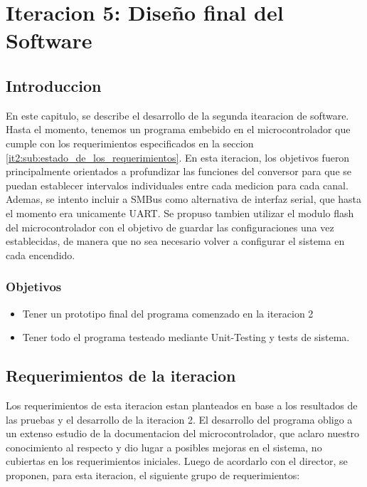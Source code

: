 \chapter{Iteracion 5: Diseño final del Software} %
\label{cha:iteracion_5}

\section{Introduccion} %
\label{it5:sec:introduccion}

En este capitulo, se describe el desarrollo de la segunda itearacion de software. Hasta el momento, tenemos un programa embebido en el microcontrolador que cumple con los requerimientos especificados en la seccion \ref{it2:sub:estado_de_los_requerimientos}. En esta iteracion, los objetivos fueron principalmente orientados a profundizar las funciones del conversor para que se puedan establecer intervalos individuales entre cada medicion para cada canal. Ademas, se intento incluir a SMBus como alternativa de interfaz serial, que hasta el momento era unicamente UART. Se propuso tambien utilizar el modulo flash del microcontrolador con el objetivo de guardar las configuraciones una vez establecidas, de manera que no sea necesario volver a configurar el sistema en cada encendido.


\subsection{Objetivos} %
\label{it5:ssec:objetivos}

\begin{itemize}
  \item Tener un prototipo final del programa comenzado en la iteracion 2
  \item Tener todo el programa testeado mediante Unit-Testing y tests de sistema.
\end{itemize}


\section{Requerimientos de la iteracion} %
\label{it5:sec:requerimientos_de_la_iteracion}

Los requerimientos de esta iteracion estan planteados en base a los resultados de las pruebas y el desarrollo de la iteracion 2. El desarrollo del programa obligo a un extenso estudio de la documentacion del microcontrolador, que aclaro nuestro conocimiento al respecto y dio lugar a posibles mejoras en el sistema, no cubiertas en los requerimientos iniciales. Luego de acordarlo con el director, se proponen, para esta iteracion, el siguiente grupo de requerimientos: 

